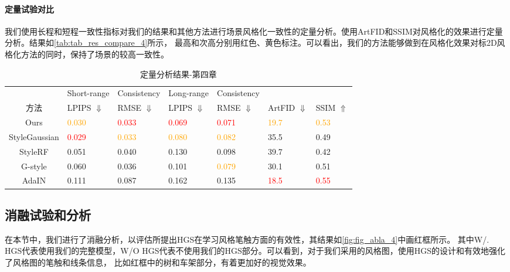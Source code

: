 \paragraph{定量试验对比}
我们使用长程和短程一致性指标对我们的结果和其他方法进行场景风格化一致性的定量分析。使用ArtFID和SSIM对风格化的效果进行定量分析。结果如\autoref{tab:tab_res_compare_4}所示，
最高和次高分别用红色、黄色标注。可以看出，我们的方法能够做到在风格化效果对标2D风格化方法的同时，保持了场景的较高一致性。
\begin{table}[htb]
    \centering
    \caption{定量分析结果-第四章}
    \label{tab:tab_res_compare_4}
    \begin{tabularx}{\textwidth}{c X<{\centering} X<{\centering} X<{\centering} X<{\centering} X<{\centering}  X<{\centering} }
        \hline
         & Short-range        & Consistency       & Long-range          & Consistency        &  &  \\
         方法   & LPIPS $\Downarrow$ &  RMSE $\Downarrow$ &  LPIPS $\Downarrow$&  RMSE $\Downarrow$ &       ArtFID $\Downarrow$ & SSIM $\Uparrow$  \\ \hline
        Ours & \textcolor{orange}{0.030}        & \textcolor{red}{0.033} & \textcolor{red}{0.069}   & \textcolor{red}{0.071} & \textcolor{orange}{19.7} & \textcolor{orange}{0.53}   \\ 
        StyleGaussian & \textcolor{red}{0.029} & \textcolor{orange}{0.033} & \textcolor{orange}{0.080} & \textcolor{orange}{0.082} &  35.5  & 0.49  \\ 
        StyleRF & 0.051            & 0.040            & 0.130            & 0.098            &    39.7        &  0.42 \\ 
        G-style & 0.060           & 0.036        & 0.101            &  \textcolor{orange}{0.079} &  30.1          &0.51 \\ 
        AdaIN & 0.111   & 0.087         & 0.162             & 0.135          & \textcolor{red}{18.5}        & \textcolor{red}{0.55} \\ \hline
    \end{tabularx}
\end{table}
\subsection{消融试验和分析}
在本节中，我们进行了消融分析，以评估所提出HGS在学习风格笔触方面的有效性，其结果如\autoref{fig:fig_abla_4}中画红框所示。
其中W/. HGS代表使用我们的完整模型，W/O HGS代表不使用我们的HGS部分。可以看到，对于我们采用的风格图，使用HGS的设计和有效地强化了风格图的笔触和线条信息，
比如红框中的树和车架部分，有着更加好的视觉效果。

